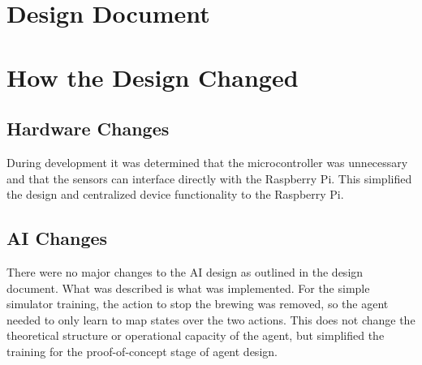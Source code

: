 \section{Design Document}


\section{How the Design Changed}

\subsection{Hardware Changes}
During development it was determined that the microcontroller was unnecessary and that the sensors can interface directly with the Raspberry Pi.
This simplified the design and centralized device functionality to the Raspberry Pi.

\subsection{AI Changes}
There were no major changes to the AI design as outlined in the design document. What was described is what was implemented.
For the simple simulator training, the action to stop the brewing was removed, so the agent needed to only learn to map states over the two actions. This does not change the theoretical structure or operational capacity of the agent, but simplified the training for the proof-of-concept stage of agent design.
